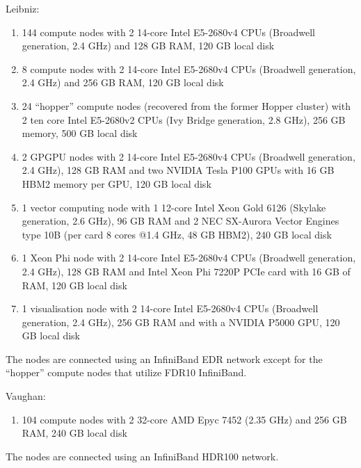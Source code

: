 \ifantwerpen
Leibniz:
  \begin{enumerate}
  \item 144 compute nodes with 2 14-core Intel E5-2680v4 CPUs (Broadwell generation, 2.4 GHz) and 128 GB RAM, 120 GB local disk
  \item 8 compute nodes with 2 14-core Intel E5-2680v4 CPUs (Broadwell generation, 2.4 GHz) and 256 GB RAM, 120 GB local disk
  \item 24 ``hopper'' compute nodes (recovered from the former Hopper cluster) with 2 ten core Intel E5-2680v2 CPUs (Ivy Bridge generation, 2.8 GHz), 256 GB memory, 500 GB local disk
  \item 2 GPGPU nodes with 2 14-core Intel E5-2680v4 CPUs (Broadwell generation, 2.4 GHz), 128 GB RAM and two NVIDIA Tesla P100 GPUs with 16 GB HBM2 memory per GPU, 120 GB local disk
  \item 1 vector computing node with 1 12-core Intel Xeon Gold 6126 (Skylake generation, 2.6 GHz), 96 GB RAM and 2 NEC SX-Aurora Vector Engines type 10B (per card 8 cores @1.4 GHz, 48 GB HBM2), 240 GB local disk
  \item 1 Xeon Phi node with 2 14-core Intel E5-2680v4 CPUs (Broadwell generation, 2.4 GHz), 128 GB RAM and Intel Xeon Phi 7220P PCIe card with 16 GB of RAM, 120 GB local disk
  \item 1 visualisation node with 2 14-core Intel E5-2680v4 CPUs (Broadwell generation, 2.4 GHz), 256 GB RAM and with a NVIDIA P5000 GPU, 120 GB local disk
  \end{enumerate}
The nodes are connected using an InfiniBand EDR network except for the ``hopper'' compute nodes that utilize FDR10 InfiniBand. 

Vaughan:
  \begin{enumerate}
  \item 104 compute nodes with 2 32-core AMD Epyc 7452 (2.35 GHz) and 256 GB RAM, 240 GB local disk
  \end{enumerate}
The nodes are connected using an InfiniBand HDR100 network.

